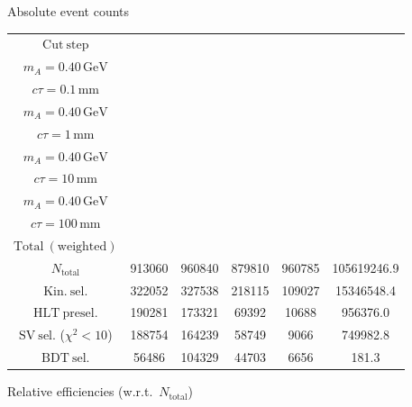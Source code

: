 \documentclass[10pt,a4paper]{article}
\renewcommand{\arraystretch}{1.4}
\begin{document}
{\footnotesize\setlength{\tabcolsep}{4pt}\renewcommand{\arraystretch}{1.05}%
\vspace{12pt}

Absolute event counts

\begin{tabular}{cccccc}
\toprule
$\mathrm{Cut\ step}$ & \shortstack{$m_{\pi}=4\,\mathrm{GeV}$\\$m_{A}=0.40\,\mathrm{GeV}$\\$c\tau=0.1\,\mathrm{mm}$} & \shortstack{$m_{\pi}=4\,\mathrm{GeV}$\\$m_{A}=0.40\,\mathrm{GeV}$\\$c\tau=1\,\mathrm{mm}$} & \shortstack{$m_{\pi}=4\,\mathrm{GeV}$\\$m_{A}=0.40\,\mathrm{GeV}$\\$c\tau=10\,\mathrm{mm}$} & \shortstack{$m_{\pi}=4\,\mathrm{GeV}$\\$m_{A}=0.40\,\mathrm{GeV}$\\$c\tau=100\,\mathrm{mm}$} & \shortstack{$\mathrm{QCD}$\\$\mathrm{Total\ (weighted)}$} \\
\midrule
$N_{\mathrm{total}}$ & 913060 & 960840 & 879810 & 960785 & 105619246.9\\
$\mathrm{Kin.\ sel.}$ & 322052 & 327538 & 218115 & 109027 & 15346548.4\\
$\mathrm{HLT\ presel.}$ & 190281 & 173321 & 69392 & 10688 & 956376.0\\
$\mathrm{SV\ sel.}$ ($\chi^2{<}10$) & 188754 & 164239 & 58749 & 9066 & 749982.8\\
$\mathrm{BDT\ sel.}$ & 56486 & 104329 & 44703 & 6656 & 181.3\\
\bottomrule
\end{tabular}

\vspace{18pt}

Relative efficiencies (w.r.t.\ $N_{\mathrm{total}}$)

}
\end{document}
